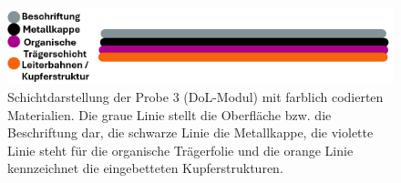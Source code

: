 \vspace{0.2cm}
\begin{figure}[H]
    \centering
    \includegraphics[scale=0.75]{Bilder/probelinie3}
    \caption{Schichtdarstellung der Probe 3 (DoL-Modul) mit farblich codierten Materialien. Die graue Linie stellt die Oberfläche bzw. die Beschriftung dar, die schwarze Linie die Metallkappe, die violette Linie steht für die organische Trägerfolie und die orange Linie kennzeichnet die eingebetteten Kupferstrukturen.}
    \label{Abbildung 13 :Schichtdarstellung der Probe 3 (DoL-Modul) mit farblich codierten Materialien. Die schwarze Linie stellt die Metallkappe dar, die violette Linie steht für die organische Trägerfolie und die orange Linie kennzeichnet die eingebetteten Kupferstrukturen.}
\end{figure}